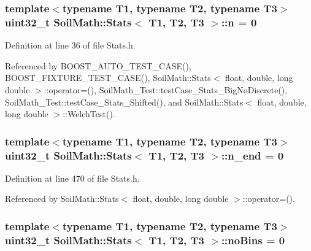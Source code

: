 \subsubsection[{n}]{\setlength{\rightskip}{0pt plus 5cm}template$<$typename T1, typename T2, typename T3$>$ uint32\+\_\+t {\bf Soil\+Math\+::\+Stats}$<$ T1, T2, T3 $>$\+::n = 0}\label{class_soil_math_1_1_stats_a7bc57af334b68253832ebac17f85d091}


Definition at line 36 of file Stats.\+h.



Referenced by B\+O\+O\+S\+T\+\_\+\+A\+U\+T\+O\+\_\+\+T\+E\+S\+T\+\_\+\+C\+A\+S\+E(), B\+O\+O\+S\+T\+\_\+\+F\+I\+X\+T\+U\+R\+E\+\_\+\+T\+E\+S\+T\+\_\+\+C\+A\+S\+E(), Soil\+Math\+::\+Stats$<$ float, double, long double $>$\+::operator=(), Soil\+Math\+\_\+\+Test\+::test\+Case\+\_\+\+Stats\+\_\+\+Big\+No\+Discrete(), Soil\+Math\+\_\+\+Test\+::test\+Case\+\_\+\+Stats\+\_\+\+Shifted(), and Soil\+Math\+::\+Stats$<$ float, double, long double $>$\+::\+Welch\+Test().

\hypertarget{class_soil_math_1_1_stats_a58553c8379f35dbc40f46ad228b5457e}{}
\subsubsection[{n\+\_\+end}]{\setlength{\rightskip}{0pt plus 5cm}template$<$typename T1, typename T2, typename T3$>$ uint32\+\_\+t {\bf Soil\+Math\+::\+Stats}$<$ T1, T2, T3 $>$\+::n\+\_\+end = 0\hspace{0.3cm}{\ttfamily [private]}}\label{class_soil_math_1_1_stats_a58553c8379f35dbc40f46ad228b5457e}


Definition at line 470 of file Stats.\+h.



Referenced by Soil\+Math\+::\+Stats$<$ float, double, long double $>$\+::operator=().

\hypertarget{class_soil_math_1_1_stats_a4202c9085eacaff2e04eda84fc90e92b}{}
\subsubsection[{no\+Bins}]{\setlength{\rightskip}{0pt plus 5cm}template$<$typename T1, typename T2, typename T3$>$ uint32\+\_\+t {\bf Soil\+Math\+::\+Stats}$<$ T1, T2, T3 $>$\+::no\+Bins = 0}\label{class_soil_math_1_1_stats_a4202c9085eacaff2e04eda84fc90e92b}


